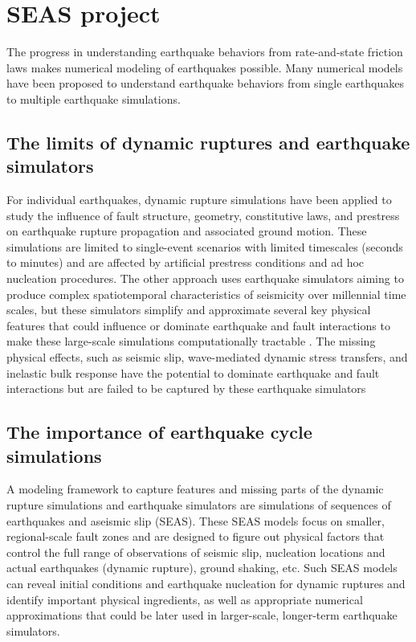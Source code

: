 \section{SEAS project}
The progress in understanding earthquake behaviors from rate-and-state friction laws makes numerical modeling of earthquakes possible. Many numerical models have been proposed to understand earthquake behaviors from single earthquakes to multiple earthquake simulations.

\subsection{The limits of dynamic ruptures and earthquake simulators}
For individual earthquakes, dynamic rupture simulations have been applied to study the influence of fault structure, geometry, constitutive laws, and prestress on earthquake rupture propagation and associated ground motion.
These simulations are limited to single-event scenarios with limited timescales (seconds to minutes) and are affected by artificial prestress conditions and ad hoc nucleation procedures.
The other approach uses earthquake simulators aiming to produce complex spatiotemporal characteristics of seismicity over millennial time scales, but these simulators simplify and approximate several key physical features that could influence or dominate earthquake and fault interactions to make these large-scale simulations computationally tractable \citep{10.1785/0220120093}. 
The missing physical effects, such as seismic slip, wave-mediated dynamic stress transfers, and inelastic bulk response have the potential to dominate earthquake and fault interactions but are failed to be captured by these earthquake simulators

\subsection{The importance of earthquake cycle simulations}
A modeling framework to capture features and missing parts of the dynamic rupture simulations and earthquake simulators are simulations of sequences of earthquakes and aseismic slip (SEAS).
These SEAS models focus on smaller, regional-scale fault zones and are designed to figure out physical factors that control the full range of observations of seismic slip, nucleation locations and actual earthquakes (dynamic rupture), ground shaking, etc.
Such SEAS models can reveal initial conditions and earthquake nucleation for dynamic ruptures and identify important physical ingredients, as well as appropriate numerical approximations that could be later used in larger-scale, longer-term earthquake simulators.


